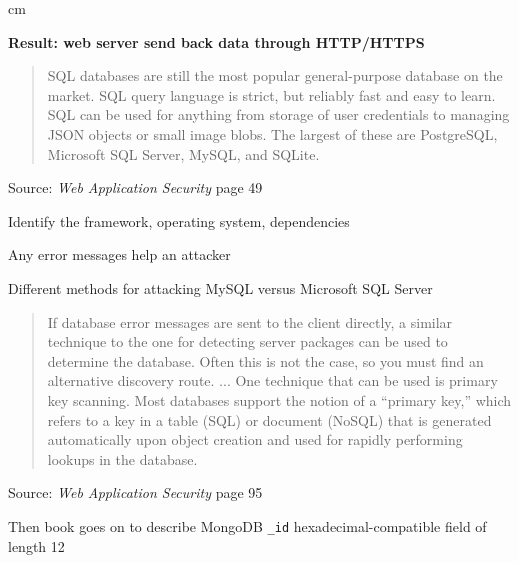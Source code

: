 \documentclass[Screen16to9,17pt]{foils}
\begin{document}
 cm

\centerline{\bf Result: web server send back data through HTTP/HTTPS}




\begin{quote}
SQL databases are still the most popular general-purpose database on the market. SQL query language is strict, but reliably fast and easy to learn. SQL can be used for anything from storage of user credentials to managing JSON objects or small image blobs. The largest of these are PostgreSQL, Microsoft SQL Server, MySQL, and SQLite.
\end{quote}
Source: \emph{Web Application Security} page 49

\begin{list2}
\item Identify the framework, operating system, dependencies
\item Any error messages help an attacker
\item Different methods for attacking MySQL versus Microsoft SQL Server
\end{list2}





\begin{quote}
If database error messages are sent to the client directly, a similar technique to the one for detecting server packages can be used to determine the database. Often this is not the case, so you must find an alternative discovery route.
...
One technique that can be used is primary key scanning. Most databases support the notion of a “primary key,” which refers to a key in a table (SQL) or document (NoSQL) that is generated automatically upon object creation and used for rapidly performing lookups in the database.
\end{quote}
Source: \emph{Web Application Security} page 95

\begin{list2}
\item Then book goes on to describe MongoDB \verb+_id+ hexadecimal-compatible field of length 12
\end{list2}




\end{document}
